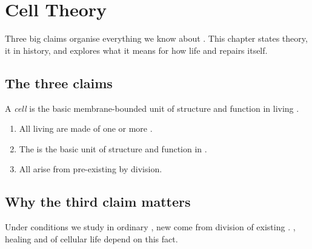 \chapter{Cell Theory}\label{ch:g6:cell-theory}

Three big claims organise everything we know about . This chapter
states  theory,  it in history, and explores what it means for
how life  and repairs itself.

\section{The three claims}

\begin{definition}[Cell]\label{def:g6:cell-theory:cell}
A \emph{cell} is the basic membrane-bounded unit of structure
and function in living .
\end{definition}


\begin{proposition}\label{prop:g6:cell-theory:three}
\begin{enumerate}
  \item All living  are made of one or more .
  \item The  is the basic unit of structure and function in
        .
  \item All  arise from pre-existing  by division.
\end{enumerate}
\end{proposition}
\admitted


\section{Why the third claim matters}

\begin{proposition}\label{prop:g6:cell-theory:from-cells}
Under conditions we study in ordinary , new  come from
division of existing . , healing and  of
cellular life depend on this fact.
\end{proposition}
\admitted


